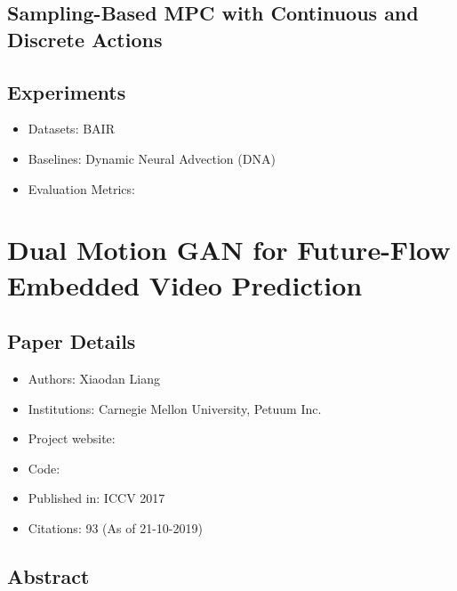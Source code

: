 \documentclass{article}
\begin{document}
    \subsection{Sampling-Based MPC with Continuous and Discrete Actions}\label{subsec:Self_Supervised_Visual_Planning_with_Temporal_Skip_Connections:sampling-based-mpc-with-continuous-and-discrete-actions}

    \subsection{Experiments}\label{subsec:Self_Supervised_Visual_Planning_with_Temporal_Skip_Connections:experiments}
    \begin{itemize}
        \item Datasets: BAIR
        \item Baselines: Dynamic Neural Advection (DNA)
        \item Evaluation Metrics:
    \end{itemize}
    \newpage


    \section{Dual Motion GAN for Future-Flow Embedded Video Prediction}\label{sec:Dual_Motion_GAN_for_Future_Flow_Embedded_Video_Prediction}
    \subsection*{Paper Details}
    \begin{itemize}
        \item Authors: Xiaodan Liang
        \item Institutions: Carnegie Mellon University, Petuum Inc.
        \item Project website:
        \item Code:
        \item Published in: ICCV 2017
        \item Citations: 93 (As of 21-10-2019)
    \end{itemize}

    \subsection*{Abstract}
\end{document}

